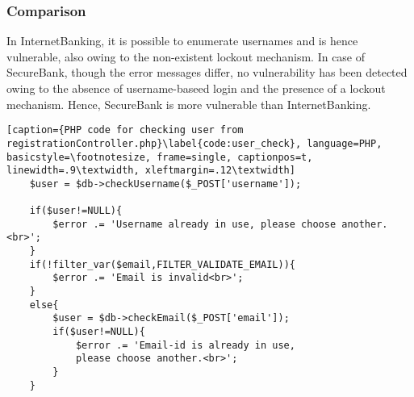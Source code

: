 \subsubsection{Comparison}
In InternetBanking, it is possible to enumerate usernames and is hence vulnerable, also owing to the non-existent lockout mechanism.
In case of SecureBank, though the error messages differ, no vulnerability has been detected owing to the absence of username-baseed login and the presence of a lockout mechanism.
Hence, SecureBank is more vulnerable than InternetBanking.
\clearpage

\begin{lstlisting}[caption={PHP code for checking user from registrationController.php}\label{code:user_check}, language=PHP, basicstyle=\footnotesize, frame=single, captionpos=t, linewidth=.9\textwidth, xleftmargin=.12\textwidth]
	$user = $db->checkUsername($_POST['username']);

	if($user!=NULL){
		$error .= 'Username already in use, please choose another.<br>';
	}
	if(!filter_var($email,FILTER_VALIDATE_EMAIL)){
		$error .= 'Email is invalid<br>';
	}
	else{
		$user = $db->checkEmail($_POST['email']);
		if($user!=NULL){
			$error .= 'Email-id is already in use,
			please choose another.<br>';
		}
	}
\end{lstlisting}